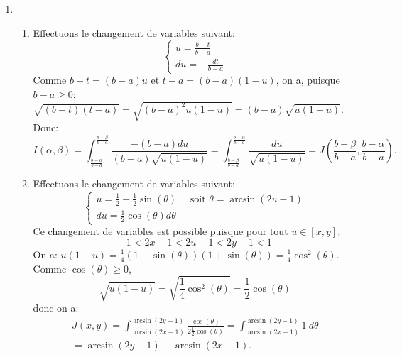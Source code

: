 \begin{enumerate}
\item
\begin{enumerate}
  \item Effectuons le changement de variables suivant:
$$\left \{ \begin{array}{ll}
            u = \frac{b-t}{b-a}\\
            du = -\frac{dt}{b-a}
           \end{array}
  \right.$$
Comme $b-t = (b-a)u$ et $t-a = (b-a)(1-u)$, on a, puisque $b-a\geq 0$: \\ 
$\sqrt{(b-t)(t-a)} = \sqrt{(b-a)^{2}u(1-u)} = (b-a)\sqrt{u(1-u)}$. Donc:
$$I(\alpha, \beta ) = \int_{\frac{b-\alpha}{b-a}}^{\frac{b-\beta}{b-a}}\frac{-(b-a)du}{(b-a)\sqrt{u(1-u)}} = 
\int_{\frac{b-\beta}{b-a}}^{\frac{b-\alpha}{b-a}}\frac{du}{\sqrt{u(1-u)}} = J\left ( \frac{b-\beta}{b-a}, \frac{b-\alpha}{b-a}   \right ).$$
\item Effectuons le changement de variables suivant:
$$\left \{ \begin{array}{ll}
            u = \frac{1}{2} + \frac{1}{2}\sin (\theta)\quad \text{ soit } \theta = \arcsin (2u-1)\\
            du = \frac{1}{2}\cos (\theta)d\theta
           \end{array}
 \right.$$
Ce changement de variables est possible puisque pour tout $u\in [x,y]$,
\begin{displaymath}
 -1<2x-1<2u-1<2y-1<1 
\end{displaymath}
On a: $u(1-u) = \frac{1}{4}(1-\sin(\theta))(1+\sin (\theta)) = \frac{1}{4}\cos^{2}(\theta)$. Comme $\cos (\theta)\geq 0$,
\begin{displaymath}
\sqrt{u(1-u)} = \sqrt{\frac{1}{4}\cos^{2}(\theta)} = \frac{1}{2}\cos(\theta)
\end{displaymath}
donc on a:
\begin{multline*}
J(x,y) = \int_{\arcsin(2x-1)}^{\arcsin (2y-1)}\frac{\cos (\theta)}{2\frac{1}{2}\cos(\theta)} 
= \int_{\arcsin(2x-1)}^{\arcsin (2y-1)}1 \ d\theta \\ = \arcsin (2y-1) - \arcsin (2x-1).  
\end{multline*}


\end{enumerate}
\end{enumerate}
